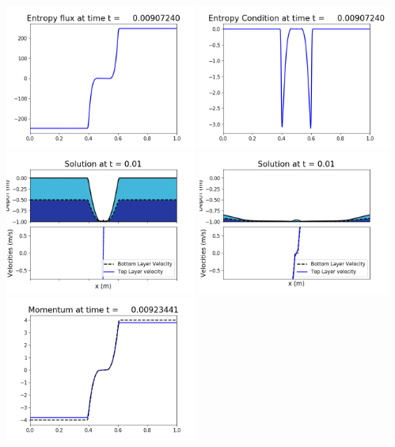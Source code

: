 \documentclass[11pt]{article}
\begin{document}
\includegraphics[width=0.475\textwidth]{frame0057fig1008.png}
\vskip 10pt 
\includegraphics[width=0.475\textwidth]{frame0057fig1009.png}
\vskip 10pt 
\includegraphics[width=0.475\textwidth]{frame0058fig1001.png}
\includegraphics[width=0.475\textwidth]{frame0058fig1002.png}
\vskip 10pt 
\includegraphics[width=0.475\textwidth]{frame0058fig1003.png}
\end{document}
